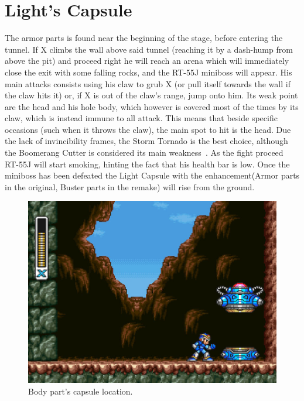 \section{Light's Capsule}
The armor parts is found near the beginning of the stage, before entering the tunnel. If X climbs the wall above said tunnel (reaching it by a dash-hump from above the pit) and proceed right he will reach an arena which will immediately close the exit with some falling rocks, and the RT-55J miniboss will appear. His main attacks consists using his claw to grub X (or pull itself towards the wall if the claw hits it) or, if X is out of the claw's range, jump onto him. Its weak point are the head and his hole body, which however is covered most of the times by its claw, which is instead immune to all attack. This means that beside specific occasions (such when it throws the claw), the main spot to hit is the head. Due the lack of invincibility frames, the Storm Tornado is the best choice, although the Boomerang Cutter is considered its main weakness~\cite{wiki:RT55J}. As the fight proceed RT-55J will start smoking, hinting the fact that his health bar is low. Once the miniboss has been defeated the Light Capsule with the enhancement(Armor parts in the original, Buster parts in the remake) will rise from the ground.
\begin{figure}[htp]
	\centering
	\includegraphics[width=0.5\linewidth]{figures/X1/Sting_chameleon/Sting_armor_capsule.jpg}
	\caption{Body part's capsule location.}
\end{figure}

